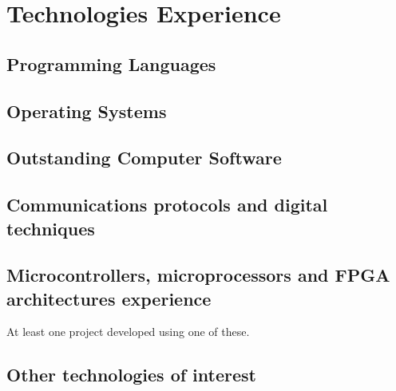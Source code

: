 
\section{Technologies Experience}
   \subsection{Programming Languages}
   \cvitem { \dicadvanced }{\proglangadvanced }
   \cvitem { \dicmedium   }{\proglangmedium }  
   \cvitem { \dicbasic    }{\proglangbasic}    

   \subsection{Operating Systems}
      \cvitem { \dicadvanced } { \osadvanced }
      \cvitem { \dicmedium   } { \osmedium   }
      \cvitem { \dicbasic    } { \osbasic    }
   \subsection{Outstanding Computer Software}
      \cvitem { \dicadvanced } { \computerprogadvanced }
      \cvitem { \dicmedium   } { \computerprogmedium   }
      \cvitem { \dicbasic    } { \computerprogbasic    }

   \subsection{Communications protocols and digital techniques}
      \cvitem{\dicadvanced }{ \protocoladvanced }
      \cvitem{\dicmedium   }{ \protocolmedium   }
      \cvitem{\dicbasic    }{ \protocolbasic    }

   \subsection{Microcontrollers, microprocessors and FPGA architectures experience}
      \cvitem {} { At least one project developed using one of these.}

   \subsection{Other technologies of interest}
      \cvitem{\dicadvanced} { \othertechadvanced }
      \cvitem{\dicmedium  } { \othertechmedium   }
      \cvitem{\dicbasic   } { \othertechbasic    }


